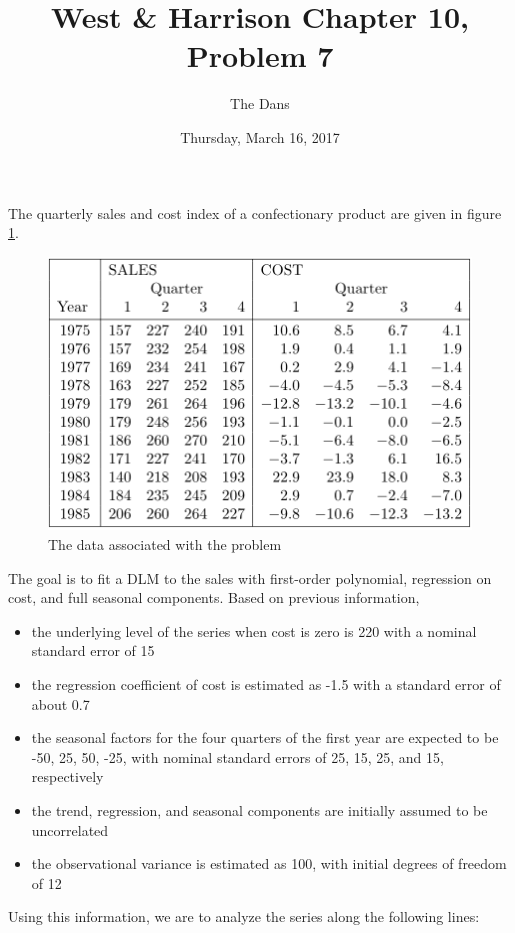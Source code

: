 \documentclass{article}
\title{West \& Harrison Chapter 10, Problem 7}
\author{The Dans}
\date{Thursday, March 16, 2017}
\begin{document}
	\maketitle
	
	The quarterly sales and cost index of a confectionary product are given in figure \ref{fig:data}.
	\begin{figure}[h]
		\centering
		\includegraphics[width=0.4\linewidth]{Data}
		\caption{The data associated with the problem}
		\label{fig:data}
	\end{figure}
	The goal is to fit a DLM to the sales with first-order polynomial, regression on cost, and full seasonal components. Based on previous information, 
	\begin{itemize}
		\item the underlying level of the series when cost is zero is 220 with a nominal standard error of 15
		\item the regression coefficient of cost is estimated as -1.5 with a standard error of about 0.7
		\item the seasonal factors for the four quarters of the first year are expected to be -50, 25, 50, -25, with nominal standard errors of 25, 15, 25, and 15, respectively
		\item the trend, regression, and seasonal components are initially assumed to be uncorrelated
		\item the observational variance is estimated as 100, with initial degrees of freedom of 12
	\end{itemize}
	Using this information, we are to analyze the series along the following lines:
\end{document}
